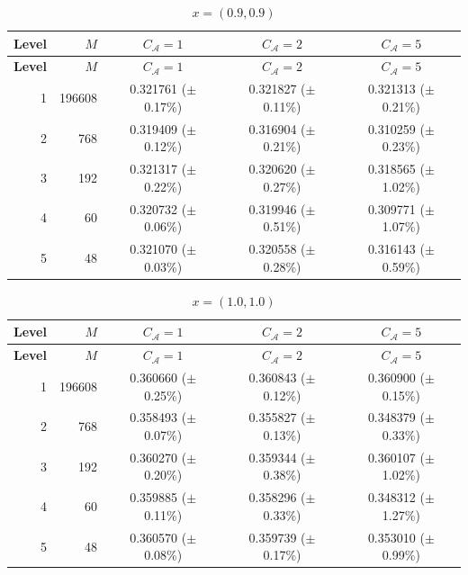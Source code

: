 \documentclass[11pt]{article}
\theoremstyle{definition}
\theoremstyle{plain}
\begin{document}
\begin{appendices}
\begin{longtable}{@{}r r c c c@{}}
\caption{$x=(0.9,0.9)$}\label{tab:mlp-x09}\\
\toprule
\textbf{Level} & \textbf{$M$} & \textbf{$C_{\mathcal A}=1$} & \textbf{$C_{\mathcal A}=2$} & \textbf{$C_{\mathcal A}=5$} \\
\midrule
\endfirsthead
\toprule
\textbf{Level} & \textbf{$M$} & \textbf{$C_{\mathcal A}=1$} & \textbf{$C_{\mathcal A}=2$} & \textbf{$C_{\mathcal A}=5$} \\
\midrule
\endhead
1 & 196608 & 0.321761 (\(\pm\) 0.17\%) & 0.321827 (\(\pm\) 0.11\%) & 0.321313 (\(\pm\) 0.21\%) \\
2 & 768    & 0.319409 (\(\pm\) 0.12\%) & 0.316904 (\(\pm\) 0.21\%) & 0.310259 (\(\pm\) 0.23\%) \\
3 & 192    & 0.321317 (\(\pm\) 0.22\%) & 0.320620 (\(\pm\) 0.27\%) & 0.318565 (\(\pm\) 1.02\%) \\
4 & 60     & 0.320732 (\(\pm\) 0.06\%) & 0.319946 (\(\pm\) 0.51\%) & 0.309771 (\(\pm\) 1.07\%) \\
5 & 48     & 0.321070 (\(\pm\) 0.03\%) & 0.320558 (\(\pm\) 0.28\%) & 0.316143 (\(\pm\) 0.59\%) \\
\bottomrule
\end{longtable}

\begin{longtable}{@{}r r c c c@{}}
\caption{$x=(1.0,1.0)$}\label{tab:mlp-x10}\\
\toprule
\textbf{Level} & \textbf{$M$} & \textbf{$C_{\mathcal A}=1$} & \textbf{$C_{\mathcal A}=2$} & \textbf{$C_{\mathcal A}=5$} \\
\midrule
\endfirsthead
\toprule
\textbf{Level} & \textbf{$M$} & \textbf{$C_{\mathcal A}=1$} & \textbf{$C_{\mathcal A}=2$} & \textbf{$C_{\mathcal A}=5$} \\
\midrule
\endhead
1 & 196608 & 0.360660 (\(\pm\) 0.25\%) & 0.360843 (\(\pm\) 0.12\%) & 0.360900 (\(\pm\) 0.15\%) \\
2 & 768    & 0.358493 (\(\pm\) 0.07\%) & 0.355827 (\(\pm\) 0.13\%) & 0.348379 (\(\pm\) 0.33\%) \\
3 & 192    & 0.360270 (\(\pm\) 0.20\%) & 0.359344 (\(\pm\) 0.38\%) & 0.360107 (\(\pm\) 1.02\%) \\
4 & 60     & 0.359885 (\(\pm\) 0.11\%) & 0.358296 (\(\pm\) 0.33\%) & 0.348312 (\(\pm\) 1.27\%) \\
5 & 48     & 0.360570 (\(\pm\) 0.08\%) & 0.359739 (\(\pm\) 0.17\%) & 0.353010 (\(\pm\) 0.99\%) \\
\bottomrule
\end{longtable}
\end{appendices}
\iffalse
\end{document}
